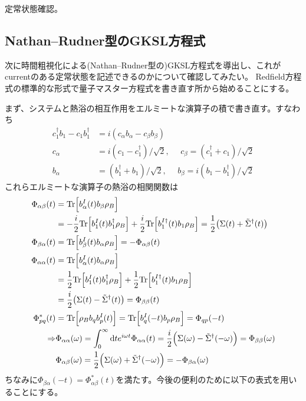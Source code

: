 \documentclass[dvipdfmx,autodetect-engine]{jsarticle}
\newcommand{\da}{\dagger}
\newcommand{\mr}[1]{\mathrm{#1}}
\newcommand{\bv}[1]{\Bigl(#1\Bigr)}
\newcommand{\ttr}[1]{\mathrm{Tr}\Bigl[#1\Bigr]}
\begin{document}
定常状態確認。

\subsection{Nathan--Rudner型のGKSL方程式}
次に時間粗視化による(Nathan--Rudner型の)GKSL方程式を導出し、これがcurrentのある定常状態を記述できるのかについて確認してみたい。
Redfield方程式の標準的な形式で量子マスター方程式を書き直す所から始めることにする。

まず、システムと熱浴の相互作用をエルミートな演算子の積で書き直す。すなわち
\begin{align}
    c^\da_1b_1 - c_1b^\da_1 &= i(c_\alpha b_\alpha - c_\beta b_\beta)\\
    c_\alpha &= i(c_1-c_1^\da)/\sqrt{2}, \ \ \ \ \ \ c_\beta = (c^\da_1 + c_1)/\sqrt{2}\\
    b_\alpha &= (b^\da_1 + b_1)/\sqrt{2}, \ \ \ \ \ \ b_\beta = i(b_1-b_1^\da)/\sqrt{2}
\end{align}
これらエルミートな演算子の熱浴の相関関数は
\begin{align}
    \Phi_{\alpha\beta}(t) &= \ttr{b^I_{\alpha}(t)b_{\beta}\rho_B}\\
    &= -\frac{i}{2}\ttr{b_1^I(t)b^\da_1\rho_B} + \frac{i}{2}\ttr{b_1^{I\da}(t)b_1\rho_B} = \frac{1}{2}\qty(\Sigma(t) + \tilde{\Sigma}^\da(t))\\
    \Phi_{\beta\alpha}(t) &= \ttr{b^I_{\beta}(t)b_{\alpha}\rho_B} = -\Phi_{\alpha\beta}(t)\\
    \Phi_{\alpha\alpha}(t) &= \ttr{b^I_{\alpha}(t)b_{\alpha}\rho_B}\\
    &= \frac{1}{2}\ttr{b_1^I(t)b^\da_1\rho_B} + \frac{1}{2}\ttr{b_1^{I\da}(t)b_1\rho_B}\\
    & =\frac{i}{2}\qty(\Sigma(t) -\tilde{\Sigma}^\da(t)) = \Phi_{\beta\beta}(t)\\
    \Phi_{pq}^*(t) &= \ttr{\rho_Bb_qb_p^I(t)} = \ttr{b_q^I(-t)b_p\rho_B} = \Phi_{qp}(-t)\\
    \Rightarrow& \Phi_{\alpha\alpha}(\omega) = \int_0^\infty \mr{d}t e^{i\omega t} \Phi_{\alpha\alpha}(t) = \frac{i}{2}\bv{\Sigma(\omega) - \tilde{\Sigma}^\da(-\omega)} = \Phi_{\beta\beta}(\omega) \\
    & \Phi_{\alpha\beta}(\omega) = \frac{1}{2}\bv{\Sigma(\omega) + \tilde{\Sigma}^\da(-\omega)} = -\Phi_{\beta\alpha}(\omega)
\end{align}
ちなみに$\Phi_{\beta\alpha}(-t) = \Phi_{\alpha\beta}^*(t)$を満たす。今後の便利のために以下の表式を用いることにする。
\end{document}
